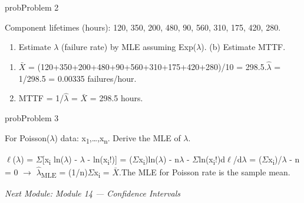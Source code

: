 \begin{PSbox}[unbreakable]{prob}{Problem 2}

Component lifetimes (hours): 120, 350, 200, 480, 90, 560, 310, 175, 420, 280.

\begin{enumerate}
\def\labelenumi{(\alph{enumi})}
\tightlist
\item
  Estimate \ensuremath{\lambda} (failure rate) by MLE assuming Exp(\ensuremath{\lambda}). (b) Estimate MTTF.
\end{enumerate}

\PSsolution{} 

\begin{enumerate}
\def\labelenumi{(\alph{enumi})}
\tightlist
\item
  \ensuremath{\bar{X}} = (120+350+200+480+90+560+310+175+420+280)/10 = 298.5.\PSbr{}\ensuremath{\hat{\lambda}} = 1/298.5 = 0.00335 failures/hour.
\item
  MTTF = 1/\ensuremath{\hat{\lambda}} = \ensuremath{\bar{X}} = 298.5 hours.
\end{enumerate}

\end{PSbox}

\begin{PSbox}[unbreakable]{prob}{Problem 3}

For Poisson(\ensuremath{\lambda}) data: x\textsubscript{1},…,x\textsubscript{n}. Derive the MLE of \ensuremath{\lambda}.

\PSsolution{} \ensuremath{\ell}(\ensuremath{\lambda}) = \ensuremath{\Sigma}[x\textsubscript{i} ln(\ensuremath{\lambda}) - \ensuremath{\lambda} - ln(x\textsubscript{i}!)] = (\ensuremath{\Sigma}x\textsubscript{i})ln(\ensuremath{\lambda}) - n\ensuremath{\lambda} - \ensuremath{\Sigma}ln(x\textsubscript{i}!)\PSbr{}d\ensuremath{\ell}/d\ensuremath{\lambda} = (\ensuremath{\Sigma}x\textsubscript{i})/\ensuremath{\lambda} - n = 0 \ensuremath{\to} \ensuremath{\hat{\lambda}}\textsubscript{MLE} = (1/n)\ensuremath{\Sigma}x\textsubscript{i} = \ensuremath{\bar{X}}.\PSbr{}The MLE for Poisson rate is the sample mean.

\emph{Next Module: {Module 14 — Confidence Intervals}}

\end{PSbox}
